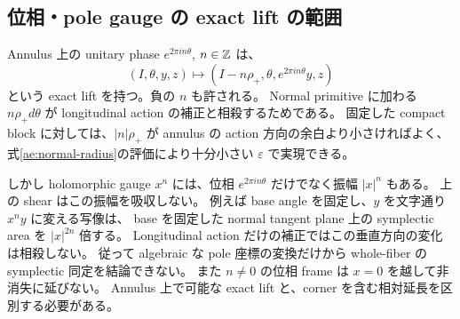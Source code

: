 \subsection{位相・pole gauge の exact lift の範囲}

Annulus 上の unitary phase $e^{2\pi in\theta}$, $n\in\mathbb Z$ は、
\[
 (I,\theta,y,z)\longmapsto
 (I-n\rho_+,\theta,e^{2\pi in\theta}y,z)
\]
という exact lift を持つ。負の $n$ も許される。
Normal primitive に加わる $n\rho_+d\theta$ が longitudinal action の補正と相殺するためである。
固定した compact block に対しては、$|n|\rho_+$ が annulus の action 方向の余白より小さければよく、
式\eqref{ae:normal-radius}の評価により十分小さい $\varepsilon$ で実現できる。

しかし holomorphic gauge $x^n$ には、位相 $e^{2\pi in\theta}$ だけでなく振幅 $|x|^n$ もある。
上の shear はこの振幅を吸収しない。
例えば base angle を固定し、$y$ を文字通り $x^ny$ に変える写像は、
base を固定した normal tangent plane 上の symplectic area を $|x|^{2n}$ 倍する。
Longitudinal action だけの補正ではこの垂直方向の変化は相殺しない。
従って algebraic な pole 座標の変換だけから whole-fiber の symplectic 同定を結論できない。
また $n\ne0$ の位相 frame は $x=0$ を越して非消失に延びない。
Annulus 上で可能な exact lift と、corner を含む相対延長を区別する必要がある。
